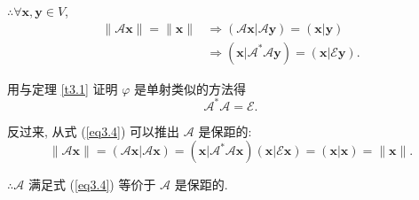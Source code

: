 \documentclass[color=black,device=normal,lang=cn,mode=geye]{elegantnote}
\begin{document}
$\therefore\forall\boldsymbol{x},\boldsymbol{y}\in V$,
\begin{align*}
    \|\mathcal{A}\boldsymbol{x}\|=\|\boldsymbol{x}\| & \Rightarrow(\mathcal{A}\boldsymbol{x}|\mathcal{A}\boldsymbol{y})=(\boldsymbol{x}|\boldsymbol{y}) \\
    & \Rightarrow(\boldsymbol{x}|\mathcal{A}^*\mathcal{A}\boldsymbol{y})=(\boldsymbol{x}|\mathcal{E}\boldsymbol{y}).
\end{align*}

用与定理 \ref{t3.1} 证明 $\varphi$ 是单射类似的方法得
\begin{equation}\label{eq3.4}
    \mathcal{A}^*\mathcal{A}=\mathcal{E}.
\end{equation}

反过来, 从式 (\ref{eq3.4}) 可以推出 $\mathcal{A}$ 是保距的:
\[\|\mathcal{A}\boldsymbol{x}\|=(\mathcal{A}\boldsymbol{x}|\mathcal{A}\boldsymbol{x})=(\boldsymbol{x}|\mathcal{A}^*\mathcal{A}\boldsymbol{x})(\boldsymbol{x}|\mathcal{E}\boldsymbol{x})=(\boldsymbol{x}|\boldsymbol{x})=\|\boldsymbol{x}\|.\]

$\therefore\mathcal{A}$ 满足式 (\ref{eq3.4}) 等价于 $\mathcal{A}$ 是保距的.
\end{document}
